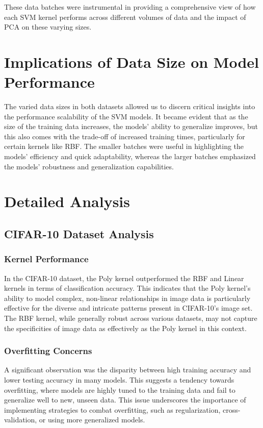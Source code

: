 \documentclass[conference]{IEEEtran}
\begin{document}
These data batches were instrumental in providing a comprehensive view of how each SVM kernel performs across different volumes of data and the impact of PCA on these varying sizes.

\section{Implications of Data Size on Model Performance}

The varied data sizes in both datasets allowed us to discern critical insights into the performance scalability of the SVM models. It became evident that as the size of the training data increases, the models' ability to generalize improves, but this also comes with the trade-off of increased training times, particularly for certain kernels like RBF. The smaller batches were useful in highlighting the models' efficiency and quick adaptability, whereas the larger batches emphasized the models' robustness and generalization capabilities.

\section{Detailed Analysis}

\subsection{CIFAR-10 Dataset Analysis}

\subsubsection{Kernel Performance}
In the CIFAR-10 dataset, the Poly kernel outperformed the RBF and Linear kernels in terms of classification accuracy. This indicates that the Poly kernel's ability to model complex, non-linear relationships in image data is particularly effective for the diverse and intricate patterns present in CIFAR-10's image set. The RBF kernel, while generally robust across various datasets, may not capture the specificities of image data as effectively as the Poly kernel in this context.

\subsubsection{Overfitting Concerns}
A significant observation was the disparity between high training accuracy and lower testing accuracy in many models. This suggests a tendency towards overfitting, where models are highly tuned to the training data and fail to generalize well to new, unseen data. This issue underscores the importance of implementing strategies to combat overfitting, such as regularization, cross-validation, or using more generalized models.
\end{document}
